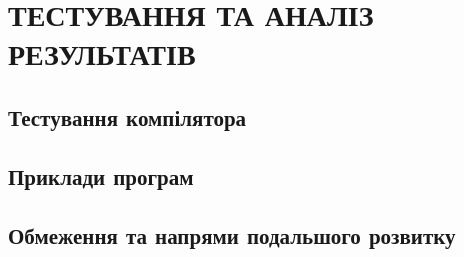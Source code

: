 \chapter{ТЕСТУВАННЯ ТА АНАЛІЗ РЕЗУЛЬТАТІВ}

\section{Тестування компілятора}

\section{Приклади програм}

\section{Обмеження та напрями подальшого розвитку}
